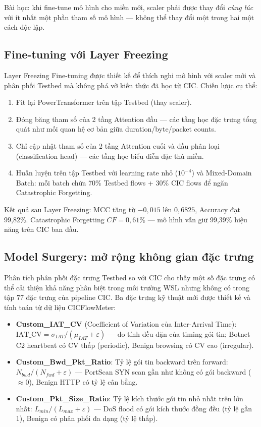 \documentclass[../DoAn.tex]{subfiles}
\begin{document}
Bài học: khi fine-tune mô hình cho miền mới, scaler phải được thay đổi \textit{cùng lúc} với ít nhất một phần tham số mô hình --- không thể thay đổi một trong hai một cách độc lập.

\subsection{Fine-tuning với Layer Freezing}
\label{subsec:gd3-freezing}

Layer Freezing Fine-tuning được thiết kế để thích nghi mô hình với scaler mới và phân phối Testbed mà không phá vỡ kiến thức đã học từ CIC. Chiến lược cụ thể:

\begin{enumerate}
    \item Fit lại PowerTransformer trên tập Testbed (thay scaler).
    \item Đóng băng tham số của 2 tầng Attention đầu --- các tầng học đặc trưng tổng quát như mối quan hệ cơ bản giữa duration/byte/packet counts.
    \item Chỉ cập nhật tham số của 2 tầng Attention cuối và đầu phân loại (classification head) --- các tầng học biểu diễn đặc thù miền.
    \item Huấn luyện trên tập Testbed với learning rate nhỏ ($10^{-4}$) và Mixed-Domain Batch: mỗi batch chứa 70\% Testbed flows + 30\% CIC flows để ngăn Catastrophic Forgetting.
\end{enumerate}

Kết quả sau Layer Freezing: MCC tăng từ $-0{,}015$ lên $0{,}6825$, Accuracy đạt 99,82\%. Catastrophic Forgetting $CF = 0{,}61\%$ --- mô hình vẫn giữ 99,39\% hiệu năng trên CIC ban đầu.

\subsection{Model Surgery: mở rộng không gian đặc trưng}
\label{subsec:gd3-surgery}

Phân tích phân phối đặc trưng Testbed so với CIC cho thấy một số đặc trưng có thể cải thiện khả năng phân biệt trong môi trường WSL nhưng không có trong tập 77 đặc trưng của pipeline CIC. Ba đặc trưng kỹ thuật mới được thiết kế và tính toán từ dữ liệu CICFlowMeter:

\begin{itemize}
    \item \textbf{Custom\_IAT\_CV} (Coefficient of Variation của Inter-Arrival Time): $\text{IAT\_CV} = \sigma_{IAT} / (\mu_{IAT} + \varepsilon)$ --- đo tính đều đặn của timing gói tin; Botnet C2 heartbeat có CV thấp (periodic), Benign browsing có CV cao (irregular).
    \item \textbf{Custom\_Bwd\_Pkt\_Ratio}: Tỷ lệ gói tin backward trên forward: $N_{bwd} / (N_{fwd} + \varepsilon)$ --- PortScan SYN scan gần như không có gói backward ($\approx 0$), Benign HTTP có tỷ lệ cân bằng.
    \item \textbf{Custom\_Pkt\_Size\_Ratio}: Tỷ lệ kích thước gói tin nhỏ nhất trên lớn nhất: $L_{min} / (L_{max} + \varepsilon)$ --- DoS flood có gói kích thước đồng đều (tỷ lệ gần 1), Benign có phân phối đa dạng (tỷ lệ thấp).
\end{itemize}
\end{document}
